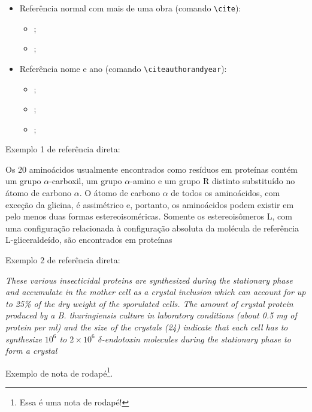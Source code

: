 \begin{itemize}
\begin{itemize}
		\item \cite{Agaisse1995};
		\item \cite{Abedi2014};
		\item \cite{BtNomenclature2016};
	\end{itemize}
	\item Referência normal com mais de uma obra (comando \verb|\cite|):
	\begin{itemize}
		\item \cite{Agaisse1995, Abedi2014};
		\item \cite{Nelson2014, BtNomenclature2016, AgapitoTenfen2014};
	\end{itemize}
	\item Referência nome e ano (comando \verb|\citeauthorandyear|):
	\begin{itemize}
		\item {};
		\item {};
		\item {};
	\end{itemize}
\end{itemize}


Exemplo 1 de referência direta:

\begin{citacao}
	Os 20 aminoácidos usualmente encontrados como resíduos em proteínas contém um grupo $\alpha$-carboxil, um grupo $\alpha$-amino e um grupo R distinto substituído no átomo de carbono $\alpha$. O átomo de carbono $\alpha$ de todos os aminoácidos, com exceção da glicina, é assimétrico e, portanto, os aminoácidos podem existir em pelo menos duas formas estereoisoméricas. Somente os estereoisômeros L, com uma configuração relacionada à configuração absoluta da molécula de referência L-gliceraldeído, são encontrados em proteínas \cite[p. 81]{Nelson2014}
\end{citacao}

Exemplo 2 de referência direta:

\begin{citacao}
	\textit{These various insecticidal proteins are synthesized during the stationary phase and accumulate in the mother cell as a crystal inclusion which can account for up to 25\% of the dry weight of the sporulated cells. The amount of crystal protein produced by a B. thuringiensis culture in laboratory conditions (about 0.5 mg of protein per ml) and the size of the crystals (24) indicate that each cell has to synthesize $10^6$ to $2 \times 10^6$ $\delta$-endotoxin molecules during the stationary phase to form a crystal} \cite[p. 1]{Agaisse1995}
\end{citacao}

Exemplo de nota de rodapé\footnote{Essa é uma nota de rodapé!}.
